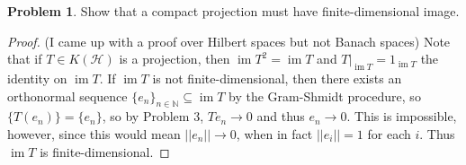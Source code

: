 \documentclass[12pt]{article}
\DeclareMathOperator{\im}{im}
\theoremstyle{definition}
\newtheorem{ex}{Problem}
\begin{document}
\begin{ex}
	Show that a compact projection must have finite-dimensional image.
\end{ex}
\begin{proof}
	(I came up with a proof over Hilbert spaces but not Banach spaces)
	Note that if $T \in K(\mathscr{H})$ is a projection, then $\im T^2 = \im T$ and $T|_{\im T} = 1_{\im T}$ the identity on $\im T$.
	If $\im T$ is not finite-dimensional, then there exists an orthonormal sequence $\lbrace e_n \rbrace_{n \in \mathbb{N}} \subseteq \im T$ by the Gram-Shmidt procedure, so $\lbrace T(e_n)\rbrace = \lbrace e_n\rbrace$, so by Problem 3, $Te_n \to 0$ and thus $e_n \to 0$.
	This is impossible, however, since this would mean $||e_n|| \to 0$, when in fact $||e_i|| = 1$ for each $i$.
	Thus $\im T$ is finite-dimensional.
\end{proof}
\end{document}
